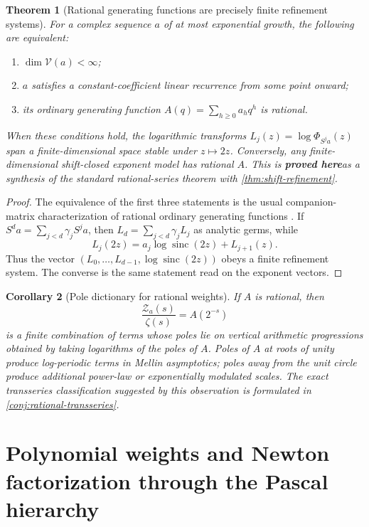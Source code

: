 \documentclass[11pt,oneside]{article}
\numberwithin{equation}{section}
\newtheorem{theorem}{Theorem}[section]
\newtheorem{corollary}[theorem]{Corollary}
\theoremstyle{definition}
\theoremstyle{remark}
\newcommand{\sinc}{\operatorname{sinc}}
\newcommand{\statusproved}{\textcolor{deepgreen}{\textbf{proved here}}}
\newcommand{\Zspec}{\mathcal Z}
\begin{document}
\begin{theorem}[Rational generating functions are precisely finite refinement systems]
\label{thm:rational-classification}
For a complex sequence $a$ of at most exponential growth, the following are equivalent:
\begin{enumerate}
\item $\dim\mathscr V(a)<\infty$;
\item $a$ satisfies a constant-coefficient linear recurrence from some point onward;
\item its ordinary generating function $A(q)=\sum_{h\ge0}a_hq^h$ is rational.
\end{enumerate}
When these conditions hold, the logarithmic transforms
$L_j(z)=\log\Phi_{S^ja}(z)$ span a finite-dimensional space stable under $z\mapsto2z$.
Conversely, any finite-dimensional shift-closed exponent model has rational $A$.
This is \statusproved as a synthesis of the standard rational-series theorem with
\cref{thm:shift-refinement}.
\end{theorem}

\begin{proof}
The equivalence of the first three statements is the usual companion-matrix characterization
of rational ordinary generating functions \cite{stanley1997}.  If
$S^da=\sum_{j<d}\gamma_jS^ja$, then
$L_d=\sum_{j<d}\gamma_jL_j$ as analytic germs, while
\[
 L_j(2z)=a_j\log\sinc(2z)+L_{j+1}(z).
\]
Thus the vector $(L_0,\ldots,L_{d-1},\log\sinc(2z))$ obeys a finite refinement system.
The converse is the same statement read on the exponent vectors.
\end{proof}

\begin{corollary}[Pole dictionary for rational weights]
\label{cor:rational-poles}
If $A$ is rational, then
\begin{equation}
 \frac{\Zspec_a(s)}{\zeta(s)}=A(2^{-s})
 \label{eq:rational-zeta-quotient}
\end{equation}
is a finite combination of terms whose poles lie on vertical arithmetic progressions
obtained by taking logarithms of the poles of $A$.  Poles of $A$ at roots of unity produce
log-periodic terms in Mellin asymptotics; poles away from the unit circle produce additional
power-law or exponentially modulated scales.  The exact transseries classification suggested
by this observation is formulated in \cref{conj:rational-transseries}.
\end{corollary}


\section{Polynomial weights and Newton factorization through the Pascal hierarchy}
\label{sec:newton}
\end{document}
